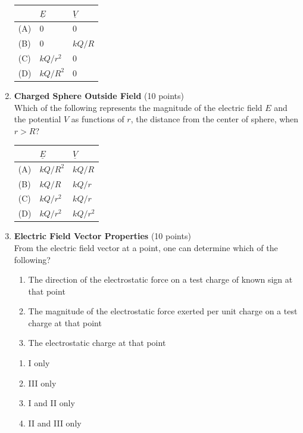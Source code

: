 \begin{enumerate}
  \begin{center}
  \begin{tabular}{|l|l|l|}
  \hline
  & $\underline{E}$ & $\underline{V}$ \\
  \hline
  (A) & 0 & 0 \\
  (B) & 0 & $kQ/R$ \\
  (C) & $kQ/r^2$ & 0 \\
  (D) & $kQ/R^2$ & 0 \\
  \hline
  \end{tabular}
  \end{center}
  \begin{subanswer}
  \end{subanswer}

  \item \textbf{Charged Sphere Outside Field} (10 points)\\
  Which of the following represents the magnitude of the electric field $E$ and the potential $V$ as functions of $r$, the distance from the center of sphere, when $r > R$?
  
  \begin{center}
  \begin{tabular}{|l|l|l|}
  \hline
  & $\underline{E}$ & $\underline{V}$ \\
  \hline
  (A) & $kQ/R^2$ & $kQ/R$ \\
  (B) & $kQ/R$ & $kQ/r$ \\
  (C) & $kQ/r^2$ & $kQ/r$ \\
  (D) & $kQ/r^2$ & $kQ/r^2$ \\
  \hline
  \end{tabular}
  \end{center}
  \begin{subanswer}
  \end{subanswer}

  \item \textbf{Electric Field Vector Properties} (10 points)\\
  From the electric field vector at a point, one can determine which of the following?
  \begin{enumerate}[label=(\Roman*)]
    \item The direction of the electrostatic force on a test charge of known sign at that point
    \item The magnitude of the electrostatic force exerted per unit charge on a test charge at that point
    \item The electrostatic charge at that point
  \end{enumerate}
  \begin{enumerate}[label=(\Alph*)]
    \item I only
    \item III only
    \item I and II only
    \item II and III only
  \end{enumerate}
  \begin{subanswer}
  \end{subanswer}


\end{enumerate}
